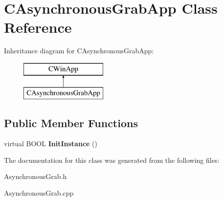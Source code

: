 \hypertarget{class_c_asynchronous_grab_app}{}\section{C\+Asynchronous\+Grab\+App Class Reference}
\label{class_c_asynchronous_grab_app}
Inheritance diagram for C\+Asynchronous\+Grab\+App\+:\begin{figure}[H]
\begin{center}
\leavevmode
\includegraphics[height=2.000000cm]{class_c_asynchronous_grab_app}
\end{center}
\end{figure}
\subsection*{Public Member Functions}
\begin{DoxyCompactItemize}
\item 
\mbox{\label{class_c_asynchronous_grab_app_a740832a02b08e1b68394718e5367b4b4}} 
virtual B\+O\+OL {\bfseries Init\+Instance} ()
\end{DoxyCompactItemize}


The documentation for this class was generated from the following files\+:\begin{DoxyCompactItemize}
\item 
Asynchronous\+Grab.\+h\item 
Asynchronous\+Grab.\+cpp\end{DoxyCompactItemize}
